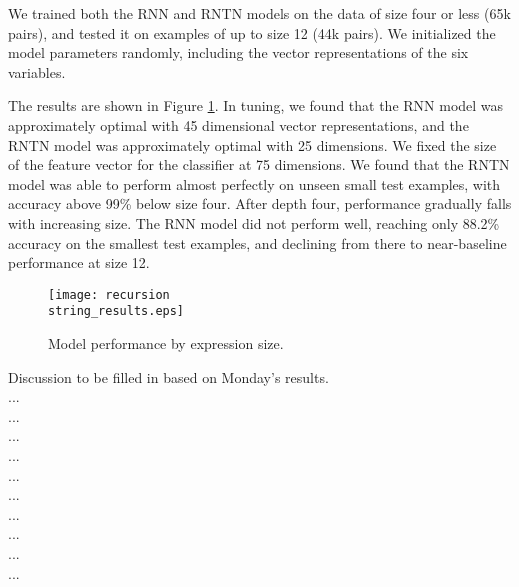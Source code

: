 We trained both the RNN and RNTN models on the data of size four or less (65k pairs), and tested it on examples of up to size 12 (44k pairs). We initialized the model parameters randomly, including the vector representations of the six variables. 

The results are shown in Figure \ref{prop-results}. In tuning, we found that the RNN model was approximately optimal with 45 dimensional vector representations, and the RNTN model was approximately optimal with 25 dimensions. We fixed the size of the feature vector for the classifier at 75 dimensions. We found that the RNTN model was able to perform almost perfectly on unseen small test examples, with accuracy above 99\% below size four. After depth four, performance gradually falls with increasing size. The RNN model did not perform well, reaching only 88.2\% accuracy on the smallest test examples, and declining from there to near-baseline performance at size 12. 

\begin{figure}[t]
\begin{center}
\texttt{[image: recursion\\string\_results.eps]}
\end{center}

\caption{Model performance by expression size.  \label{prop-results}} 
\end{figure}


Discussion to be filled in based on Monday's results.\\...\\...\\...\\...\\...\\...\\...\\...\\...\\...




